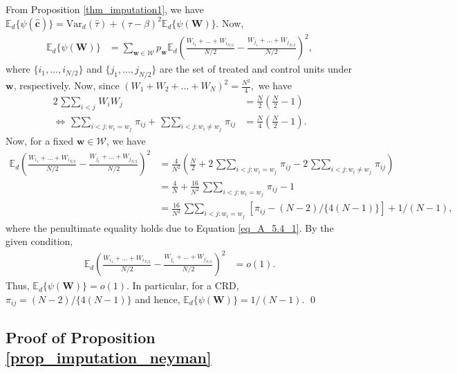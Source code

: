 \documentclass[12pt]{article}
\newcommand{\Var}{{\text{Var}}}
\newcommand{\E}{{\mathbb{E}}}
\begin{document}
From Proposition \ref{thm_imputation1}, we have $\E_d\{\psi(\hat{\bm{c}})\} = \Var_d(\hat{\tau}) + (\tau - \beta)^2\E_d\{\psi(\bm{W})\}$. Now, 
\begin{align}
    \E_d\{\psi(\bm{W})\} & = \sum_{\bm{w}\in \mathcal{W}}p_{\bm{w}}\E_d\left(\frac{W_{i_1}+ ...+W_{i_{N/2}}}{N/2} - \frac{W_{j_1}+ ...+W_{j_{N/2}}}{N/2}  \right)^2,
\end{align}
where $\{i_1,...,i_{N/2}\}$ and $\{j_1,...,j_{N/2}\}$ are the set of treated and control units under $\bm{w}$, respectively. Now, since $(W_1+W_2 + ... +W_N)^2 = \frac{N^2}{4},$ we have
\begin{align}
2\mathop{\sum\sum}_{i<j}W_iW_j & = \frac{N}{2}\left(\frac{N}{2} - 1 \right)    \nonumber \\
\iff \mathop{\sum\sum}_{i<j:w_i = w_j}\pi_{ij} + \mathop{\sum\sum}_{i<j:w_i \neq w_j}\pi_{ij} &= \frac{N}{4}\left(\frac{N}{2} - 1 \right). \label{eq_A_5.4_1}
\end{align}
Now, for a fixed $\bm{w} \in \mathcal{W}$, we have
\begin{align}
\E_d\left(\frac{W_{i_1}+ ...+W_{i_{N/2}}}{N/2} - \frac{W_{j_1}+ ...+W_{j_{N/2}}}{N/2}  \right)^2 & = \frac{4}{N^2}\left(\frac{N}{2} + 2\mathop{\sum\sum}_{i<j:w_i = w_j}\pi_{ij} - 2\mathop{\sum\sum}_{i<j:w_i \neq w_j}\pi_{ij}   \right) \nonumber \\
& = \frac{4}{N} + \frac{16}{N^2}\mathop{\sum\sum}_{i<j:w_i = w_j}\pi_{ij} - 1 \nonumber\\
& = \frac{16}{N^2}\mathop{\sum\sum}_{i<j:w_i = w_j}[\pi_{ij} - (N-2)/\{4(N-1)\}] + 1/(N-1),
\end{align}
where the penultimate equality holds due to Equation \ref{eq_A_5.4_1}. By the given condition,
\begin{align}
\E_d\left(\frac{W_{i_1}+ ...+W_{i_{N/2}}}{N/2} - \frac{W_{j_1}+ ...+W_{j_{N/2}}}{N/2}  \right)^2 & = o\left(1\right).
\end{align}
Thus, $\E_d\{\psi(\bm{W})\} = o(1)$.
In particular, for a CRD, $\pi_{ij} = (N-2)/\{4(N-1)\}$ and hence, $\E_d\{\psi(\bm{W})\} = 1/(N-1)$.
\qed


\subsection{Proof of Proposition \ref{prop_imputation_neyman}}
\end{document}
